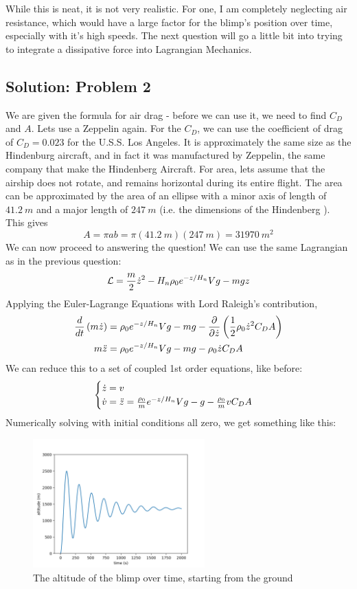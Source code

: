 \documentclass[titlepage]{article}
\begin{document}
While this is neat, it is not very realistic. For one, I am completely neglecting air resistance, which would have a large factor for the blimp's position over time, especially with it's high speeds. The next question will go a little bit into trying to integrate a dissipative force into Lagrangian Mechanics.

\subsection{Solution: Problem 2}

We are given the formula for air drag - before we can use it, we need to find $C_D$ and $A$. Lets use a Zeppelin again. For the $C_D$, we can use the coefficient of drag of $C_D = 0.023$ \cite{usslosangeles} for the U.S.S. Los Angeles. It is approximately the same size as the Hindenburg aircraft, and in fact it was manufactured by Zeppelin, the same company that make the Hindenberg Aircraft. For area, lets assume that the airship does not rotate, and remains horizontal during its entire flight. The area can be approximated by the area of an ellipse with a minor axis of length of $41.2~m$ and a major length of $247~m$ (i.e. the dimensions of the Hindenberg \cite{zeppelin}). This gives
\[
    A = \pi a b = \pi (41.2~m)(247~m) = 31970~m^2
\]
We can now proceed to answering the question! We can use the same Lagrangian as in the previous question:
\[
    \mathcal{L} = {m \over 2} \dot{z}^2 - H_n \rho_0 e^{-z/H_n} V g - mgz
\]
Applying the Euler-Lagrange Equations with Lord Raleigh's contribution,
\[
    \begin{split}
        {d \over dt} \left( m\dot{z} \right) &= \rho_0 e^{-z / H_n} V g - mg - \frac{\partial}{\partial \dot{z}} \left( \frac{1}{2} \rho_0 \dot{z}^{2} C_{D} A \right) \\
        m\ddot{z} &= \rho_0 e^{-z / H_n} V g - mg -  \rho_0 \dot{z} C_{D} A
    \end{split}
\]
We can reduce this to a set of coupled 1st order equations, like before:
\[
    \begin{cases}
        \dot{z} = v \\
        \dot{v} = \ddot{z} = {\rho_0 \over m} e^{-z / H_n} V g - g - \frac{\rho_0}{m} v C_D A
    \end{cases}
\]
Numerically solving with initial conditions all zero, we get something like this:
\begin{figure}[h]
    \centering
    \includegraphics[width=250px]{p2_drag_0.png}
    \caption{The altitude of the blimp over time, starting from the ground}
\end{figure}
\end{document}

